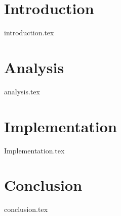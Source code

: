\documentclass[
    nolot,
    color,   %
	table,   %
    twoside, %
]{fithesis/fithesis3}
\begin{document}
  \pagestyle{plain}
  
  \chapter{Introduction}
  {introduction.tex}
  \chapter{Analysis}
  {analysis.tex}
  \chapter{Implementation}
  {Implementation.tex}
  
  \chapter{Conclusion}
  {conclusion.tex}
  {}
\end{document}
